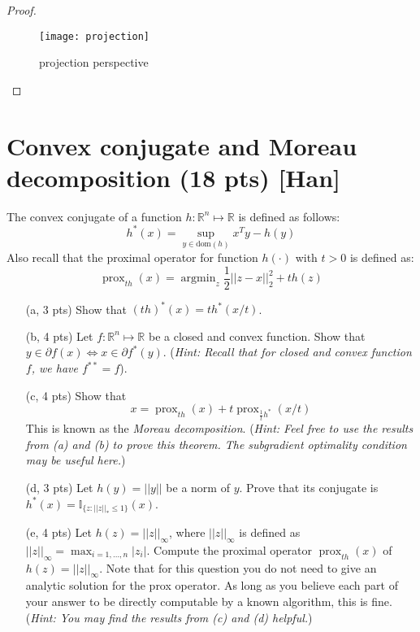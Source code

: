 \documentclass{article}
\theoremstyle{remark}
\theoremstyle{definition}
\newcommand{\argmin}{\mathop{\mathrm{argmin}}}
\newcommand{\RR}{\mathbb{R}}
\newcommand{\prox}{\operatorname{prox}}
\begin{document}
\begin{proof}
\begin{enumerate}[(a)]
        \begin{figure}[H]
  \centering
\texttt{[image: projection]}
  \caption[]
   { projection perspective}
\end{figure}

\end{enumerate}
\end{proof}




\section{Convex conjugate and Moreau decomposition (18 pts) [Han]}
The convex conjugate of a function $h: \RR^n\mapsto\RR$ is defined as follows:
$$h^*(x) = \sup_{y\in\text{dom}(h)}x^Ty - h(y)$$
Also recall that the proximal operator for function $h(\cdot)$ with $t > 0$ is defined as:
$$\prox_{th}(x) = \argmin_{z}\frac{1}{2}||z-x||_2^2 + th(z)$$
    \begin{enumerate}[(a)]
        \item[(a, 3 pts)]     Show that $(th)^*(x) = th^*(x/t)$. 
        \item[(b, 4 pts)]     Let $f:\RR^n\mapsto\RR$ be a closed and convex function. Show that $y\in\partial f(x)\Leftrightarrow x\in\partial f^*(y)$. (\emph{Hint: Recall that for closed and convex function $f$, we have $f^{**} = f$}).
        \item[(c, 4 pts)]    Show that 
                $$x = \prox_{th}(x) + t\prox_{\frac{1}{t}h^*}(x/t)$$
                This is known as the \emph{Moreau decomposition}. (\emph{Hint: Feel free to use the results from (a) and (b) to prove this theorem. The subgradient optimality condition may be useful here.})
        \item[(d, 3 pts)]     Let $h(y) = ||y||$ be a norm of $y$. Prove that its conjugate is $h^*(x) = \mathbb{I}_{\{z: ||z||_*\leq 1\}}(x)$.
        \item[(e, 4 pts)]     Let $h(z) = ||z||_\infty$, where $||z||_\infty$ is defined as $||z||_\infty = \max_{i = 1, \ldots, n}|z_i|$. Compute the proximal operator $\prox_{th}(x)$ of $h(z) = ||z||_\infty$. Note that for this question you do not need to give an analytic solution for the prox operator. As long as you believe each part of your answer to be directly computable by a known algorithm, this is fine. (\emph{Hint: You may find the results from (c) and (d) helpful.})
    \end{enumerate}
\end{document}
